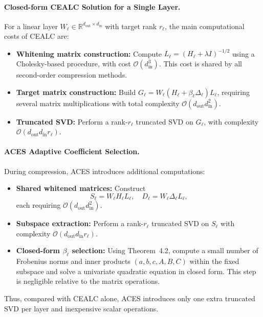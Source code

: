 \paragraph{Closed-form CEALC Solution for a Single Layer.}
For a linear layer $W_\ell \in \mathbb{R}^{d_{\mathrm{out}} \times d_{\mathrm{in}}}$ with target rank $r_\ell$, the main computational costs of CEALC are:

\begin{itemize}
    \item \textbf{Whitening matrix construction:} Compute $L_\ell = (H_\ell + \lambda I)^{-1/2}$ using a Cholesky-based procedure, with cost $\mathcal{O}(d_{\mathrm{in}}^3)$. This cost is shared by all second-order compression methods.
    \item \textbf{Target matrix construction:} Build $G_\ell = W_\ell(H_\ell + \beta_\ell \Delta_\ell)L_\ell$, requiring several matrix multiplications with total complexity $\mathcal{O}(d_{\mathrm{out}} d_{\mathrm{in}}^2)$.
    \item \textbf{Truncated SVD:} Perform a rank-$r_\ell$ truncated SVD on $G_\ell$, with complexity $\mathcal{O}(d_{\mathrm{out}} d_{\mathrm{in}} r_\ell)$.
\end{itemize}

\paragraph{ACES Adaptive Coefficient Selection.}
During compression, ACES introduces additional computations:

\begin{itemize}
    \item \textbf{Shared whitened matrices:} Construct
    \[
    S_\ell = W_\ell H_\ell L_\ell, \quad D_\ell = W_\ell \Delta_\ell L_\ell,
    \]
    each requiring $\mathcal{O}(d_{\mathrm{out}} d_{\mathrm{in}}^2)$.
    \item \textbf{Subspace extraction:} Perform a rank-$r_\ell$ truncated SVD on $S_\ell$ with complexity $\mathcal{O}(d_{\mathrm{out}} d_{\mathrm{in}} r_\ell)$.
    \item \textbf{Closed-form $\beta_\ell$ selection:} Using Theorem~4.2, compute a small number of Frobenius norms and inner products $(a,b,c,A,B,C)$ within the fixed subspace and solve a univariate quadratic equation in closed form. This step is negligible relative to the matrix operations.
\end{itemize}

Thus, compared with CEALC alone, ACES introduces only one extra truncated SVD per layer and inexpensive scalar operations.

